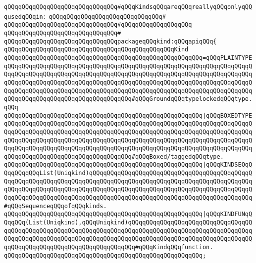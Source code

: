 \verb|qQQqqQQqqQQqqQQqqQQqqQQqqQQqqQQq#qQQqKindsqQQqareqQQqreallyqQQqonlyqQQqusedqQQqin:|\newline
\verb|qQQqqQQqqQQqqQQqqQQqqQQqqQQqqQQq#|\newline
\verb|qQQqqQQqqQQqqQQqqQQqqQQqqQQqqQQq#qQQqqQQqqQQqqQQqqQQq|\newline
\verb|qQQqqQQqqQQqqQQqqQQqqQQqqQQqqQQq#|\newline
\verb|qQQqqQQqqQQqqQQqqQQqqQQqqQQqqQQqpackageqQQqkind:qQQqapiqQQq{|\newline
\verb|qQQqqQQqqQQqqQQqqQQqqQQqqQQqqQQqqQQqqQQqqQQqqQQqKind|\newline
\verb|qQQqqQQqqQQqqQQqqQQqqQQqqQQqqQQqqQQqqQQqqQQqqQQqqQQqqQQq=qQQqPLAINTYPEqQQqqQQqqQQqqQQqqQQqqQQqqQQqqQQqqQQqqQQqqQQqqQQqqQQqqQQqqQQqqQQqqQQqqQQqqQQqqQQqqQQqqQQqqQQqqQQqqQQqqQQqqQQqqQQqqQQqqQQqqQQqqQQqqQQqqQQqqQQqqQQqqQQqqQQqqQQqqQQqqQQqqQQqqQQqqQQqqQQqqQQqqQQqqQQqqQQqqQQqqQQqqQQqqQQqqQQqqQQqqQQqqQQqqQQqqQQqqQQqqQQqqQQqqQQqqQQqqQQqqQQqqQQqqQQqqQQqqQQqqQQqqQQqqQQqqQQqqQQqqQQqqQQqqQQqqQQq#qQQqGroundqQQqtypelockedqQQqtype.qQQq|\newline
\verb|qQQqqQQqqQQqqQQqqQQqqQQqqQQqqQQqqQQqqQQqqQQqqQQqqQQqqQQq|\verb#|qQQqBOXEDTYPEqQQqqQQqqQQqqQQqqQQqqQQqqQQqqQQqqQQqqQQqqQQqqQQqqQQqqQQqqQQqqQQqqQQqqQQqqQQqqQQqqQQqqQQqqQQqqQQqqQQqqQQqqQQqqQQqqQQqqQQqqQQqqQQqqQQqqQQqqQQqqQQqqQQqqQQqqQQqqQQqqQQqqQQqqQQqqQQqqQQqqQQqqQQqqQQqqQQqqQQqqQQqqQQqqQQqqQQqqQQqqQQqqQQqqQQqqQQqqQQqqQQqqQQqqQQqqQQqqQQqqQQqqQQqqQQqqQQqqQQqqQQqqQQqqQQqqQQqqQQqqQQqqQQqqQQqqQQq#\verb|#qQQqBoxed/taggedqQQqtype.|\newline
\verb|qQQqqQQqqQQqqQQqqQQqqQQqqQQqqQQqqQQqqQQqqQQqqQQqqQQqqQQq|\verb#|qQQqKINDSEQqQQqqQQqqQQqList(Uniqkind)qQQqqQQqqQQqqQQqqQQqqQQqqQQqqQQqqQQqqQQqqQQqqQQqqQQqqQQqqQQqqQQqqQQqqQQqqQQqqQQqqQQqqQQqqQQqqQQqqQQqqQQqqQQqqQQqqQQqqQQqqQQqqQQqqQQqqQQqqQQqqQQqqQQqqQQqqQQqqQQqqQQqqQQqqQQqqQQqqQQqqQQqqQQqqQQqqQQqqQQqqQQqqQQqqQQqqQQqqQQqqQQqqQQqqQQqqQQqqQQqqQQqqQQqqQQqqQQq#\verb|#qQQqSequenceqQQqofqQQqkinds.|\newline
\verb|qQQqqQQqqQQqqQQqqQQqqQQqqQQqqQQqqQQqqQQqqQQqqQQqqQQqqQQq|\verb#|qQQqKINDFUNqQQqqQQq(List(Uniqkind),qQQqUniqkind)qQQqqQQqqQQqqQQqqQQqqQQqqQQqqQQqqQQqqQQqqQQqqQQqqQQqqQQqqQQqqQQqqQQqqQQqqQQqqQQqqQQqqQQqqQQqqQQqqQQqqQQqqQQqqQQqqQQqqQQqqQQqqQQqqQQqqQQqqQQqqQQqqQQqqQQqqQQqqQQqqQQqqQQqqQQqqQQqqQQqqQQqqQQqqQQqqQQqqQQqqQQqqQQqqQQq#\verb|#qQQqKindqQQqfunction.|\newline
\verb|qQQqqQQqqQQqqQQqqQQqqQQqqQQqqQQqqQQqqQQqqQQqqQQqqQQqqQQq;|\newline
